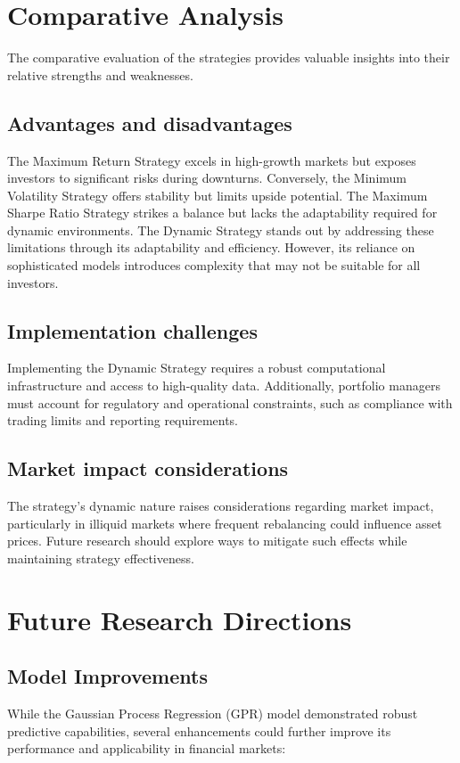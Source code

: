 \section{Comparative Analysis}
The comparative evaluation of the strategies provides valuable insights into their relative strengths and weaknesses.


\subsection{Advantages and disadvantages}
The Maximum Return Strategy excels in high-growth markets but exposes investors to significant risks during downturns. Conversely, the Minimum Volatility Strategy offers stability but limits upside potential. The Maximum Sharpe Ratio Strategy strikes a balance but lacks the adaptability required for dynamic environments.
The Dynamic Strategy stands out by addressing these limitations through its adaptability and efficiency. However, its reliance on sophisticated models introduces complexity that may not be suitable for all investors.
\subsection{Implementation challenges}
Implementing the Dynamic Strategy requires a robust computational infrastructure and access to high-quality data. Additionally, portfolio managers must account for regulatory and operational constraints, such as compliance with trading limits and reporting requirements.
\subsection{Market impact considerations}

The strategy's dynamic nature raises considerations regarding market impact, particularly in illiquid markets where frequent rebalancing could influence asset prices. Future research should explore ways to mitigate such effects while maintaining strategy effectiveness.

\section{Future Research Directions}

\subsection{Model Improvements}
While the Gaussian Process Regression (GPR) model demonstrated robust predictive capabilities, several enhancements could further improve its performance and applicability in financial markets:

